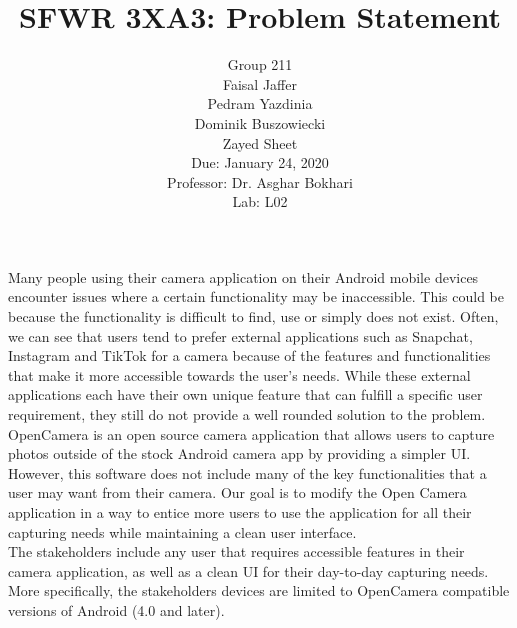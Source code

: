 \documentclass[12pt, oneside]{article}
\title{SFWR 3XA3: Problem Statement}
\author{Group 211
		\\ Faisal Jaffer
		\\ Pedram Yazdinia
		\\ Dominik Buszowiecki
		\\ Zayed Sheet
		\\ Due: January 24, 2020
		\\Professor: Dr. Asghar Bokhari
		\\ Lab: L02}
\date{}
\begin{document}
\maketitle

Many people using their camera application on their Android mobile devices encounter issues where a certain functionality may be inaccessible. This could be because the functionality is difficult to find, use or simply does not exist. Often, we can see that users tend to prefer external applications such as Snapchat, Instagram and TikTok for a camera because of the features and functionalities that make it more accessible towards the user’s needs. While these external applications each have their own unique feature that can fulfill a specific user requirement, they still do not provide a well rounded solution to the problem. 
\\

OpenCamera is an open source camera application that allows users to capture photos outside of the stock Android camera app by providing a simpler UI. However, this software does not include many of the key functionalities that a user may want from their camera. Our goal is to modify the Open Camera application in a way to entice more users to use the application for all their capturing needs while maintaining a clean user interface. 
\\

The stakeholders include any user that requires accessible features in their camera application, as well as a clean UI for their day-to-day capturing needs. More specifically, the stakeholders devices are limited to OpenCamera compatible versions of Android (4.0 and later).

    



\end{document}
